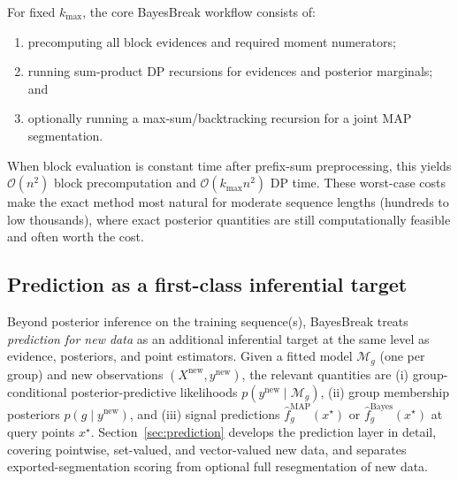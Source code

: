 For fixed $k_{\max}$, the core BayesBreak workflow consists of:
\begin{enumerate}[label=(\alph*), leftmargin=2.3em]
\item precomputing all block evidences and required moment numerators;
\item running sum-product DP recursions for evidences and posterior marginals; and
\item optionally running a max-sum/backtracking recursion for a joint MAP segmentation.
\end{enumerate}
When block evaluation is constant time after prefix-sum preprocessing, this yields
$\mathcal{O}(n^2)$ block precomputation and $\mathcal{O}(k_{\max}n^2)$ DP time. These worst-case
costs make the exact method most natural for moderate sequence lengths (hundreds to low
thousands), where exact posterior quantities are still computationally feasible and often worth
the cost.

\subsection{Prediction as a first-class inferential target}
\label{sec:problem-prediction}

Beyond posterior inference on the training sequence(s), BayesBreak treats \emph{prediction for new
data} as an additional inferential target at the same level as evidence, posteriors, and point
estimators. Given a fitted model $\mathcal{M}_g$ (one per group) and new observations
$(X^{\mathrm{new}},y^{\mathrm{new}})$, the relevant quantities are (i) group-conditional
posterior-predictive likelihoods $p(y^{\mathrm{new}}\mid \mathcal{M}_g)$, (ii) group membership
posteriors $p(g\mid y^{\mathrm{new}})$, and (iii) signal predictions
$\widehat f^{\mathrm{MAP}}_g(x^\star)$ or $\widehat f^{\mathrm{Bayes}}_g(x^\star)$ at query
points $x^\star$. Section~\ref{sec:prediction} develops the prediction layer in detail, covering pointwise,
set-valued, and vector-valued new data, and separates exported-segmentation scoring from optional
full resegmentation of new data.
